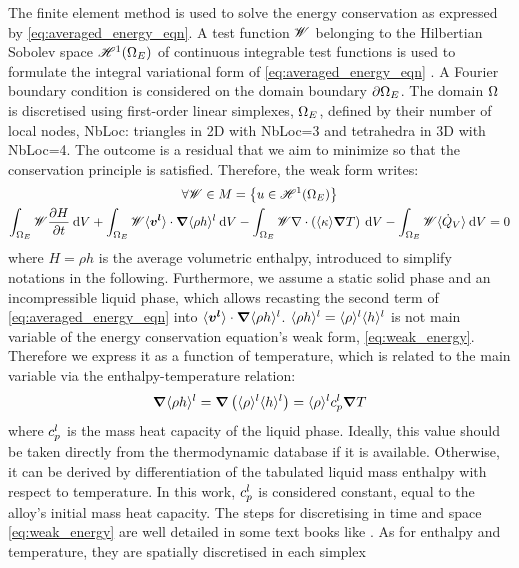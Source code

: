The finite element method is used to solve the energy conservation as expressed by \cref{eq:averaged_energy_eqn}. 
A test function $\mathscr{W}$ belonging to the Hilbertian Sobolev space $\mathscr{H}^1(\Omega_E)$ of continuous integrable test functions 
is used to formulate the integral variational form of \cref{eq:averaged_energy_eqn} \citep{suli_lecture_2000}. 
A Fourier boundary condition is considered on the domain boundary $\partial \Omega_E$. The domain $\Omega$
is discretised using first-order linear simplexes, $\Omega_E$, defined by their number of local nodes, NbLoc: triangles 
in 2D with NbLoc=3 and tetrahedra in 3D with  NbLoc=4. The outcome is a residual that we aim to minimize so that the 
conservation principle is satisfied. Therefore, the weak form writes:
\begin{multline}
\label{eq:weak_energy}
\forall \mathscr{W} \in M=\left\{ u \in \mathscr{H}^1(\Omega_E) \right\} \\
\int_{\Omega_E} \mathscr{W} \frac{\partial H}{\partial t} \: \mathrm{d}V 
 + \int_{\Omega_E} \mathscr{W} \langle \boldsymbol{v^l} \rangle \cdot \boldsymbol{\nabla} \langle \rho h \rangle^l\: \mathrm{d}V
 - \int_{\Omega_E} \mathscr{W} \nabla \cdot \left(  \langle \kappa \rangle \boldsymbol{\nabla} T \right) \: \mathrm{d}V
 - \int_{\Omega_E} \mathscr{W} \langle \dot{Q}_{{V}} \rangle \: \mathrm{d}V
 = 0
\end{multline}
where $H=\rho h$ is the average volumetric enthalpy, introduced to simplify notations in the following. 
Furthermore, we assume a static solid phase and an incompressible liquid phase, which allows recasting the second term of 
\cref{eq:averaged_energy_eqn} into $\langle \boldsymbol{v^l} \rangle \cdot \boldsymbol{\nabla} \langle \rho h \rangle^l$. 
$\langle \rho h \rangle^l = \langle \rho \rangle^l \langle h \rangle^l$ is not main variable of the energy conservation equation's weak form, \cref{eq:weak_energy}.
Therefore we express it as a function of temperature, which is related to the main variable
via the enthalpy-temperature relation: 
\begin{align}
\label{eq:enthalpy_advection}
\boldsymbol{\nabla} \langle \rho h \rangle^l = \boldsymbol{\nabla} \left( \langle \rho \rangle^l \langle h \rangle^l \right) = \langle \rho \rangle^l c_p^l \boldsymbol{\nabla} T
\end{align}
where $c_p^l$ is the mass heat capacity of the liquid phase. Ideally, this value should
be taken directly from the thermodynamic database if it is available. Otherwise, it can be derived by differentiation 
of the tabulated liquid mass enthalpy with respect to temperature. In this work, $c_p^l$ is considered constant, 
equal to the alloy's initial mass heat capacity.  
The steps for discretising in time and space \cref{eq:weak_energy} are well detailed in  
some text books like \citet{rappaz_numerical_2003}. 
As for enthalpy and temperature, they are spatially discretised in each simplex 
